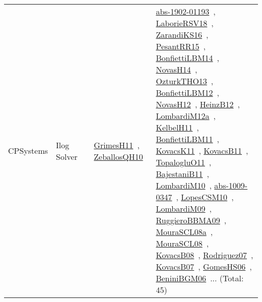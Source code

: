 {\begin{longtable}{lp{3cm}>{\raggedright\arraybackslash}p{6cm}>{\raggedright\arraybackslash}p{6cm}>{\raggedright\arraybackslash}p{8cm}}
CPSystems & Ilog Solver &  & \href{works/GrimesH11.pdf}{GrimesH11}~\cite{GrimesH11}, \href{works/ZeballosQH10.pdf}{ZeballosQH10}~\cite{ZeballosQH10} & \href{works/abs-1902-01193.pdf}{abs-1902-01193}~\cite{abs-1902-01193}, \href{works/LaborieRSV18.pdf}{LaborieRSV18}~\cite{LaborieRSV18}, \href{works/ZarandiKS16.pdf}{ZarandiKS16}~\cite{ZarandiKS16}, \href{works/PesantRR15.pdf}{PesantRR15}~\cite{PesantRR15}, \href{works/BonfiettiLBM14.pdf}{BonfiettiLBM14}~\cite{BonfiettiLBM14}, \href{works/NovasH14.pdf}{NovasH14}~\cite{NovasH14}, \href{works/OzturkTHO13.pdf}{OzturkTHO13}~\cite{OzturkTHO13}, \href{works/BonfiettiLBM12.pdf}{BonfiettiLBM12}~\cite{BonfiettiLBM12}, \href{works/NovasH12.pdf}{NovasH12}~\cite{NovasH12}, \href{works/HeinzB12.pdf}{HeinzB12}~\cite{HeinzB12}, \href{works/LombardiM12a.pdf}{LombardiM12a}~\cite{LombardiM12a}, \href{works/KelbelH11.pdf}{KelbelH11}~\cite{KelbelH11}, \href{works/BonfiettiLBM11.pdf}{BonfiettiLBM11}~\cite{BonfiettiLBM11}, \href{works/KovacsK11.pdf}{KovacsK11}~\cite{KovacsK11}, \href{works/KovacsB11.pdf}{KovacsB11}~\cite{KovacsB11}, \href{works/TopalogluO11.pdf}{TopalogluO11}~\cite{TopalogluO11}, \href{works/BajestaniB11.pdf}{BajestaniB11}~\cite{BajestaniB11}, \href{works/LombardiM10.pdf}{LombardiM10}~\cite{LombardiM10}, \href{works/abs-1009-0347.pdf}{abs-1009-0347}~\cite{abs-1009-0347}, \href{works/LopesCSM10.pdf}{LopesCSM10}~\cite{LopesCSM10}, \href{works/LombardiM09.pdf}{LombardiM09}~\cite{LombardiM09}, \href{works/RuggieroBBMA09.pdf}{RuggieroBBMA09}~\cite{RuggieroBBMA09}, \href{works/MouraSCL08a.pdf}{MouraSCL08a}~\cite{MouraSCL08a}, \href{works/MouraSCL08.pdf}{MouraSCL08}~\cite{MouraSCL08}, \href{works/KovacsB08.pdf}{KovacsB08}~\cite{KovacsB08}, \href{works/Rodriguez07.pdf}{Rodriguez07}~\cite{Rodriguez07}, \href{works/KovacsB07.pdf}{KovacsB07}~\cite{KovacsB07}, \href{works/GomesHS06.pdf}{GomesHS06}~\cite{GomesHS06}, \href{works/BeniniBGM06.pdf}{BeniniBGM06}~\cite{BeniniBGM06}... (Total: 45)\\

\end{longtable}}
